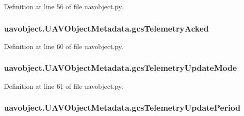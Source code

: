 Definition at line 56 of file uavobject.\-py.

\hypertarget{classuavobject_1_1_u_a_v_object_metadata_ac5e05f3b4b83c639c727a5e4729fc879}{
\subsubsection[{gcs\-Telemetry\-Acked}]{\setlength{\rightskip}{0pt plus 5cm}uavobject.\-U\-A\-V\-Object\-Metadata.\-gcs\-Telemetry\-Acked}}\label{classuavobject_1_1_u_a_v_object_metadata_ac5e05f3b4b83c639c727a5e4729fc879}


Definition at line 60 of file uavobject.\-py.

\hypertarget{classuavobject_1_1_u_a_v_object_metadata_ab479d0f584976724f6b22b15ceb62b8f}{
\subsubsection[{gcs\-Telemetry\-Update\-Mode}]{\setlength{\rightskip}{0pt plus 5cm}uavobject.\-U\-A\-V\-Object\-Metadata.\-gcs\-Telemetry\-Update\-Mode}}\label{classuavobject_1_1_u_a_v_object_metadata_ab479d0f584976724f6b22b15ceb62b8f}


Definition at line 61 of file uavobject.\-py.

\hypertarget{classuavobject_1_1_u_a_v_object_metadata_a7ac85bf7eacc9bf93cb67c02a348c5d5}{
\subsubsection[{gcs\-Telemetry\-Update\-Period}]{\setlength{\rightskip}{0pt plus 5cm}uavobject.\-U\-A\-V\-Object\-Metadata.\-gcs\-Telemetry\-Update\-Period}}\label{classuavobject_1_1_u_a_v_object_metadata_a7ac85bf7eacc9bf93cb67c02a348c5d5}


